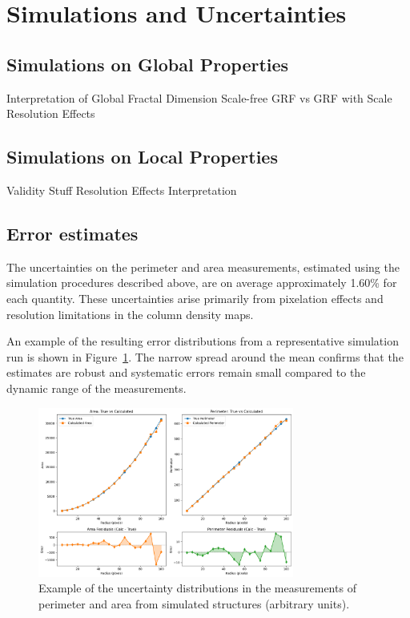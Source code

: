 \section{Simulations and Uncertainties}

\subsection{Simulations on Global Properties}
Interpretation of Global Fractal Dimension
Scale-free GRF vs GRF with Scale
Resolution Effects

\subsection{Simulations on Local Properties}

Validity Stuff
Resolution Effects
Interpretation

\subsection{Error estimates}

The uncertainties on the perimeter and area measurements, estimated using the simulation procedures described above, are on average approximately 1.60\% for each quantity. These uncertainties arise primarily from pixelation effects and resolution limitations in the column density maps.  

An example of the resulting error distributions from a representative simulation run is shown in Figure~\ref{fig:uncertainties}. The narrow spread around the mean confirms that the estimates are robust and systematic errors remain small compared to the dynamic range of the measurements.

\begin{figure}[t]
    \centering
    \includegraphics[width=0.75\textwidth]{figures/perimeter_area_uncertainties.png}
    \caption{Example of the uncertainty distributions in the measurements of perimeter and area from simulated structures (arbitrary units).}
    \label{fig:uncertainties}
\end{figure}

